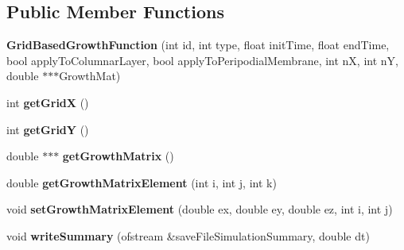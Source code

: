 \subsection*{Public Member Functions}
\begin{DoxyCompactItemize}
\item 
\hypertarget{classGridBasedGrowthFunction_a1533e384b3ab79323e91ce68245c9a10}{}{\bfseries Grid\+Based\+Growth\+Function} (int id, int type, float init\+Time, float end\+Time, bool apply\+To\+Columnar\+Layer, bool apply\+To\+Peripodial\+Membrane, int n\+X, int n\+Y, double $\ast$$\ast$$\ast$Growth\+Mat)\label{classGridBasedGrowthFunction_a1533e384b3ab79323e91ce68245c9a10}

\item 
\hypertarget{classGridBasedGrowthFunction_ae36e6ea2e7bdf41459e74d5846d6d24d}{}int {\bfseries get\+Grid\+X} ()\label{classGridBasedGrowthFunction_ae36e6ea2e7bdf41459e74d5846d6d24d}

\item 
\hypertarget{classGridBasedGrowthFunction_a4a70e9e187e3079e29115f106d30e26e}{}int {\bfseries get\+Grid\+Y} ()\label{classGridBasedGrowthFunction_a4a70e9e187e3079e29115f106d30e26e}

\item 
\hypertarget{classGridBasedGrowthFunction_ac25ac1f12b74816a1d3d3e5dda0e8541}{}double $\ast$$\ast$$\ast$ {\bfseries get\+Growth\+Matrix} ()\label{classGridBasedGrowthFunction_ac25ac1f12b74816a1d3d3e5dda0e8541}

\item 
\hypertarget{classGridBasedGrowthFunction_a1775fe1788bc97569c892d01cc625ea8}{}double {\bfseries get\+Growth\+Matrix\+Element} (int i, int j, int k)\label{classGridBasedGrowthFunction_a1775fe1788bc97569c892d01cc625ea8}

\item 
\hypertarget{classGridBasedGrowthFunction_a9d01fcbba5732aad966659d4f64c145b}{}void {\bfseries set\+Growth\+Matrix\+Element} (double ex, double ey, double ez, int i, int j)\label{classGridBasedGrowthFunction_a9d01fcbba5732aad966659d4f64c145b}

\item 
\hypertarget{classGridBasedGrowthFunction_a659418841b4a3bc8be1dec15f95d7b76}{}void {\bfseries write\+Summary} (ofstream \&save\+File\+Simulation\+Summary, double dt)\label{classGridBasedGrowthFunction_a659418841b4a3bc8be1dec15f95d7b76}

\end{DoxyCompactItemize}
